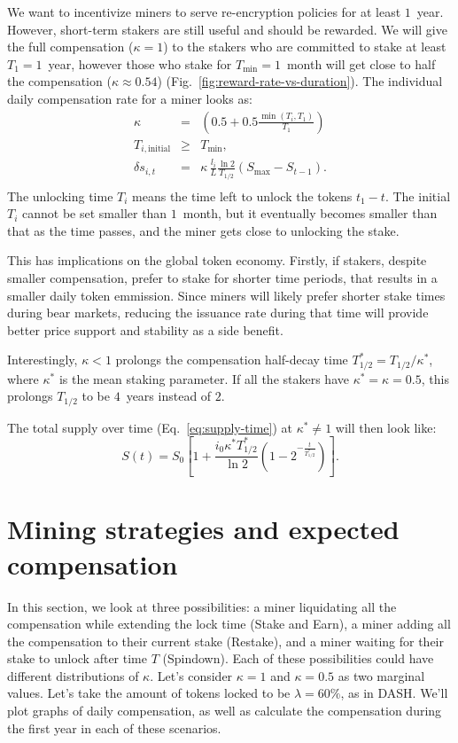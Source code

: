 \documentclass[longbibliography,nofootinbib,twocolumn]{revtex4-1}
\newcommand{\figref}[1]{Fig.~\ref{#1}}
\begin{document}
We want to incentivize miners to serve re-encryption policies for at least $1$~year.
However, short-term stakers are still useful and should be rewarded.
We will give the full compensation ($\kappa=1$) to the stakers who are committed to stake at least $T_1=1$~year,
however those who stake for $T_{\min}=1$~month will get close to half the compensation ($\kappa\approx0.54$) (\figref{fig:reward-rate-vs-duration}).
The individual daily compensation rate for a miner looks as:
\begin{eqnarray}
    \kappa &=& \left(0.5 + 0.5\frac{\min(T_i, T_1)}{T_1}\right)\\
    T_{i,\text{initial}} &\ge& T_{\min},\\
    \delta s_{i,t} &=&  \kappa\, \frac{l_i}{L} \frac{\ln{2}}{T_{1/2}} \left( S_{\max} - S_{t-1}\right).\\
\end{eqnarray}
The unlocking time $T_i$ means the time left to unlock the tokens $t_1 - t$.
The initial $T_i$ cannot be set smaller than $1$~month,
but it eventually becomes smaller than that as the time passes, and the miner gets close to unlocking the stake.

This has implications on the global token economy.
Firstly, if stakers, despite smaller compensation, prefer to stake for shorter time periods, that results in a smaller daily token emmission.
Since miners will likely prefer shorter stake times during bear markets, reducing the issuance rate during that time will provide better price support and stability
as a side benefit.

Interestingly, $\kappa < 1$ prolongs the compensation half-decay time $T_{1/2}^* = T_{1/2} / \kappa^*$, where $\kappa^*$ is the mean staking parameter.
If all the stakers have $\kappa^* = \kappa = 0.5$, this prolongs $T_{1/2}$ to be $4$~years instead of $2$.

The total supply over time (Eq.~\ref{eq:supply-time}) at $\kappa^* \ne 1$ will then look like:
\begin{equation}
    \label{eq:adjusted-supply-time}
    S(t) = S_0 \left[1 + \frac{i_0 \kappa^* T_{1/2}^*}{\ln{2}}\left(1 - 2^{-\frac{t}{T_{1/2}^*}} \right) \right].
\end{equation}

\section{Mining strategies and expected compensation}

In this section, we look at three possibilities:
a miner liquidating all the compensation while extending the lock time (Stake and Earn),
a miner adding all the compensation to their current stake (Restake),
and a miner waiting for their stake to unlock after time $T$ (Spindown).
Each of these possibilities could have different distributions of $\kappa$.
Let's consider $\kappa=1$ and $\kappa=0.5$ as two marginal values.
Let's take the amount of tokens locked to be $\lambda=60\%$, as in DASH.
We'll plot graphs of daily compensation, as well as calculate the compensation during the first year in each of these scenarios.
\end{document}
